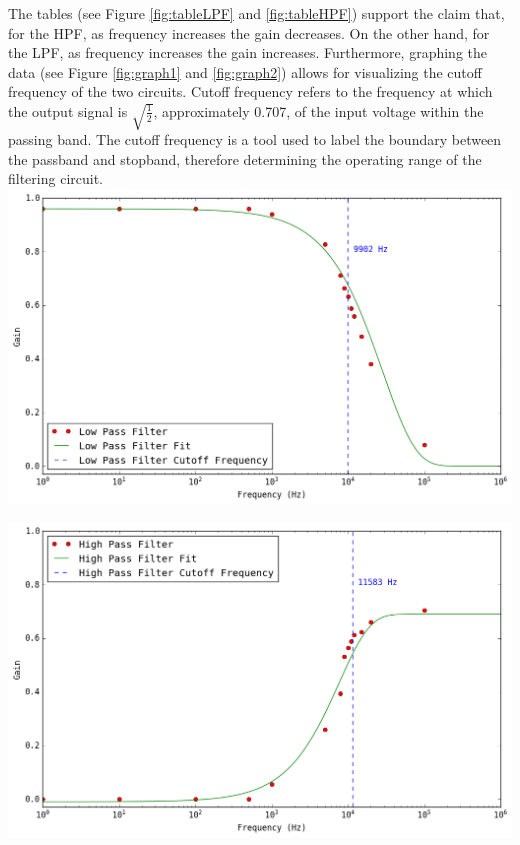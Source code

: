 \documentclass[journal]{IEEEtran}
\begin{document}
\noindent The tables (see Figure \ref{fig:tableLPF} and \ref{fig:tableHPF}) support the claim that, for the HPF, as frequency increases the gain decreases. On the other hand, for the LPF, as frequency increases the gain increases. Furthermore, graphing the data (see Figure \ref{fig:graph1} and \ref{fig:graph2}) allows for visualizing the cutoff frequency of the two circuits. Cutoff frequency refers to the frequency at which the output signal is $\sqrt{\frac{1}{2}}$, approximately 0.707, of the input voltage within the passing band. The cutoff frequency is a tool used to label the boundary between the passband and stopband, therefore determining the operating range of the filtering circuit.\\

\begingroup
    \medskip
    \centering
    \includegraphics[width=\columnwidth]{images/lab4_11.png}
    \label{fig:graph1}
    \medskip
\endgroup

\begingroup
    \medskip
    \centering
    \includegraphics[width=\columnwidth]{images/lab4_10.png}
    \label{fig:graph2}
    \medskip
\endgroup
\end{document}
